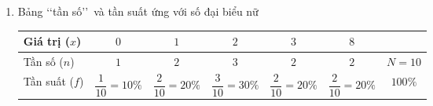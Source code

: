 \begin{vd}
{\begin{enumerate}
\begin{center}
\begin{tabular}{|c|c|c|}
					\hline
					$7$ &$2$ &$\dfrac{2}{10}=20\%$\\
					\hline
					$9$ &$1$ &$\dfrac{1}{10}=10\%$\\
					\hline
					$10$ &$1$ &$\dfrac{1}{10}=10\%$\\
					\hline
					$11$ &$1$ &$\dfrac{1}{10}=10\%$\\
					\hline
					$13$ &$1$ &$\dfrac{1}{10}=10\%$\\
					\hline
					$16$ &$1$ &$\dfrac{1}{10}=10\%$\\
					\hline
					$30$ &$2$ &$\dfrac{2}{10}=20\%$\\
					\hline
					&$N=10$ &$100\%$\\
					\hline
				\end{tabular}
			\end{center}
			\item Bảng \lq\lq tần số\rq\rq\ và tần suất ứng với số đại biểu nữ
			\begin{center}
				\begin{tabular}{|l|c|c|c|c|c|c|}
					\hline
					Giá trị ($x$) &$0$ &$1$ &$2$ &$3$ &$8$ &\\
					\hline
					Tần số ($n$) &$1$ &$2$ &$3$ &$2$ &$2$ &$N=10$\\
					\hline
					Tần suất ($f$) &$\dfrac{1}{10}=10\%$ &$\dfrac{2}{10}=20\%$ &$\dfrac{3}{10}=30\%$ &$\dfrac{2}{10}=20\%$ &$\dfrac{2}{10}=20\%$ &$100\%$\\
					\hline
				\end{tabular}
			\end{center}
		\end{enumerate}
	}
\end{vd}
